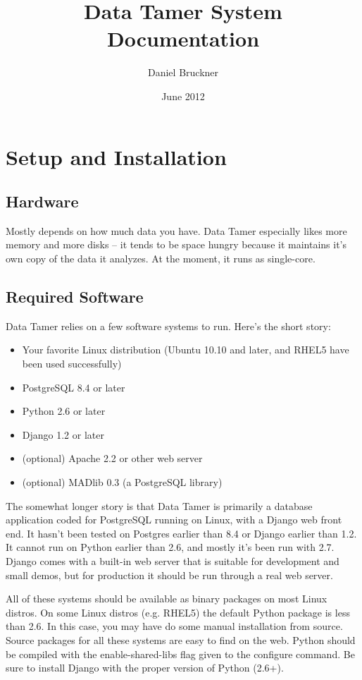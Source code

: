 \documentclass[12pt]{article}
\author{Daniel Bruckner}
\title{Data Tamer System Documentation}
\date{June 2012}
\begin{document}
\maketitle
\tableofcontents

\raggedright

\section{Setup and Installation}

\subsection{Hardware}

Mostly depends on how much data you have.  Data Tamer especially likes more memory and more disks -- it tends to be space hungry because it maintains it's own copy of the data it analyzes.  At the moment, it runs as single-core.


\subsection{Required Software}

Data Tamer relies on a few software systems to run.  Here's the short story:

\begin{itemize}
\item Your favorite Linux distribution (Ubuntu 10.10 and later, and RHEL5 have been used successfully)
\item PostgreSQL 8.4 or later
\item Python 2.6 or later
\item Django 1.2 or later
\item (optional) Apache 2.2 or other web server
\item (optional) MADlib 0.3 (a PostgreSQL library)
\end{itemize}

The somewhat longer story is that Data Tamer is primarily a database application coded for PostgreSQL running on Linux, with a Django web front end.  It hasn't been tested on Postgres earlier than 8.4 or Django earlier than 1.2.  It cannot run on Python earlier than 2.6, and mostly it's been run with 2.7.  Django comes with a built-in web server that is suitable for development and small demos, but for production it should be run through a real web server.

All of these systems should be available as binary packages on most Linux distros.  On some Linux distros (e.g. RHEL5) the default Python package is less than 2.6.  In this case, you may have do some manual installation from source.  Source packages for all these systems are easy to find on the web.  Python should be compiled with the enable-shared-libs flag given to the configure command.  Be sure to install Django with the proper version of Python (2.6+).
\end{document}

